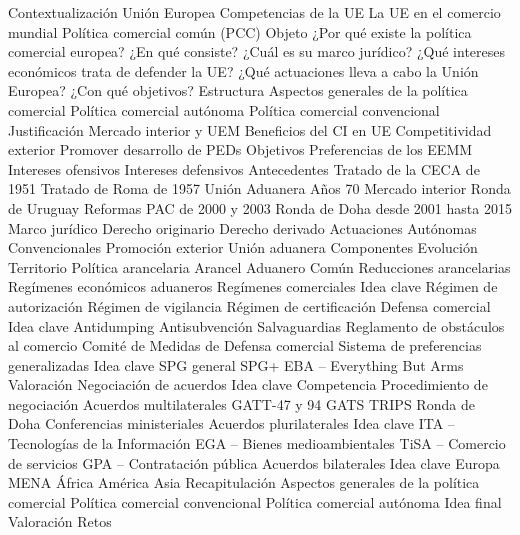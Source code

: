 \documentclass{nuevotema}
\begin{document}
\begin{esquema}[enumerate]
	\1[] 
		\2 Contextualización
			\3 Unión Europea
			\3 Competencias de la UE
			\3 La UE en el comercio mundial
			\3 Política comercial común (PCC)
		\2 Objeto
			\3 ¿Por qué existe la política comercial europea?
			\3 ¿En qué consiste?
			\3 ¿Cuál es su marco jurídico?
			\3 ¿Qué intereses económicos trata de defender la UE?
			\3 ¿Qué actuaciones lleva a cabo la Unión Europea?
			\3 ¿Con qué objetivos?
		\2 Estructura
			\3 Aspectos generales de la política comercial
			\3 Política comercial autónoma
			\3 Política comercial convencional
	\1 
		\2 Justificación
			\3 Mercado interior y UEM
			\3 Beneficios del CI en UE
			\3 Competitividad exterior
			\3 Promover desarrollo de PEDs
		\2 Objetivos
			\3 Preferencias de los EEMM
			\3 Intereses ofensivos
			\3 Intereses defensivos
		\2 Antecedentes
			\3 Tratado de la CECA de 1951
			\3 Tratado de Roma de 1957
			\3 Unión Aduanera
			\3 Años 70
			\3 Mercado interior
			\3 Ronda de Uruguay
			\3 Reformas PAC de 2000 y 2003
			\3 Ronda de Doha desde 2001 hasta 2015
		\2 Marco jurídico
			\3 Derecho originario
			\3 Derecho derivado
		\2 Actuaciones
			\3 Autónomas
			\3 Convencionales
			\3 Promoción exterior
	\1 
		\2 Unión aduanera
			\3 Componentes
			\3 Evolución
			\3 Territorio
		\2 Política arancelaria
			\3 Arancel Aduanero Común
			\3 Reducciones arancelarias
			\3 Regímenes económicos aduaneros
		\2 Regímenes comerciales
			\3 Idea clave
			\3 Régimen de autorización
			\3 Régimen de vigilancia
			\3 Régimen de certificación
		\2 Defensa comercial
			\3 Idea clave
			\3 Antidumping
			\3 Antisubvención
			\3 Salvaguardias
			\3 Reglamento de obstáculos al comercio
			\3 Comité de Medidas de Defensa comercial
		\2 Sistema de preferencias generalizadas
			\3 Idea clave
			\3 SPG general
			\3 SPG+
			\3 EBA -- Everything But Arms
			\3 Valoración
	\1 
		\2 Negociación de acuerdos
			\3 Idea clave
			\3 Competencia
			\3 Procedimiento de negociación
		\2 Acuerdos multilaterales
			\3 GATT-47 y 94
			\3 GATS
			\3 TRIPS
			\3 Ronda de Doha
			\3 Conferencias ministeriales
		\2 Acuerdos plurilaterales
			\3 Idea clave
			\3 ITA -- Tecnologías de la Información
			\3 EGA -- Bienes medioambientales
			\3 TiSA -- Comercio de servicios
			\3 GPA -- Contratación pública
		\2 Acuerdos bilaterales
			\3 Idea clave
			\3 Europa
			\3 MENA
			\3 África
			\3 América
			\3 Asia
	\1[] \marcar{Conclusión}
		\2 Recapitulación
			\3 Aspectos generales de la política comercial
			\3 Política comercial convencional
			\3 Política comercial autónoma
		\2 Idea final
			\3 Valoración
			\3 Retos

\end{esquema}
\end{document}
